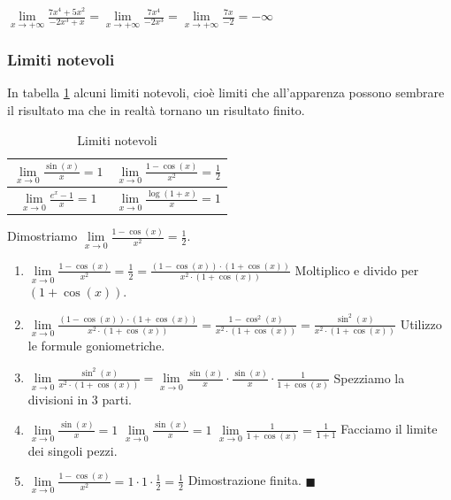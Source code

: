 \begin{example}
$\lim\limits_{x\to +\infty}\frac{7x^4 + 5x^2}{-2x^3 + x} = \lim\limits_{x\to +\infty}\frac{7x^4}{-2x^3} = \lim\limits_{x\to +\infty}\frac{7x}{-2} = -\infty$
\end{example}

\subsubsection{Limiti notevoli}
In tabella \ref{tab:limiti-notevoli} alcuni limiti notevoli, cioè limiti che all'apparenza possono sembrare il risultato ma che in realtà tornano un risultato finito.
\begin{table}[h!]
    \centering
    \setlength{\tabcolsep}{10pt}
    \renewcommand{\arraystretch}{2.5}
    \begin{tabular}{|c|c|}
        \hline
        $\lim\limits_{x\to 0}\frac{\sin(x)}{x} = 1$ & $\lim\limits_{x\to 0} \frac{1-\cos(x)}{x^2} = \frac{1}{2}$ \\\hline
        $\lim\limits_{x\to 0}\frac{e^x-1}{x} = 1$ & $\lim\limits_{x\to 0}\frac{\log(1+x)}{x} = 1$\\
        \hline
    \end{tabular}
    \caption{Limiti notevoli}
    \label{tab:limiti-notevoli}
\end{table}
\begin{demostration}
Dimostriamo $\lim\limits_{x\to 0} \frac{1-\cos(x)}{x^2} = \frac{1}{2}$.
\begin{enumerate}
    \item $\lim\limits_{x\to 0} \frac{1-\cos(x)}{x^2} = \frac{1}{2} = \frac{(1-\cos(x)) \cdot (1+\cos(x))}{x^2 \cdot (1+\cos(x))}$ \hspace{.7cm} Moltiplico e divido per $(1+\cos(x))$.
    \item $\lim\limits_{x\to 0} \frac{(1-\cos(x)) \cdot (1+\cos(x))}{x^2 \cdot (1+\cos(x))} = \frac{1-\cos^2(x)}{x^2 \cdot (1 + \cos(x))} = \frac{\sin^2(x)}{x^2 \cdot (1 + \cos(x))}$ \hspace{.7cm} Utilizzo le formule goniometriche.
    \item $\lim\limits_{x\to 0}\frac{\sin^2(x)}{x^2 \cdot (1 + \cos(x))} = \lim\limits_{x\to 0}\frac{\sin(x)}{x} \cdot \frac{\sin(x)}{x} \cdot \frac{1}{1 + \cos(x)}$ \hspace{.7cm} Spezziamo la divisioni in 3 parti.
    \item $\lim\limits_{x\to 0}\frac{\sin(x)}{x} = 1$ \: \: $\lim\limits_{x\to 0}\frac{\sin(x)}{x} = 1$ \: \: $\lim\limits_{x\to 0}\frac{1}{1 + \cos(x)} = \frac{1}{1 + 1}$ \hspace{.7cm} Facciamo il limite dei singoli pezzi.
    \item $\lim\limits_{x\to 0}\frac{1-\cos(x)}{x^2} = 1 \cdot 1 \cdot \frac{1}{2} = \frac{1}{2}$ \hspace{.7cm} Dimostrazione finita. $\blacksquare$
\end{enumerate}
\end{demostration}

